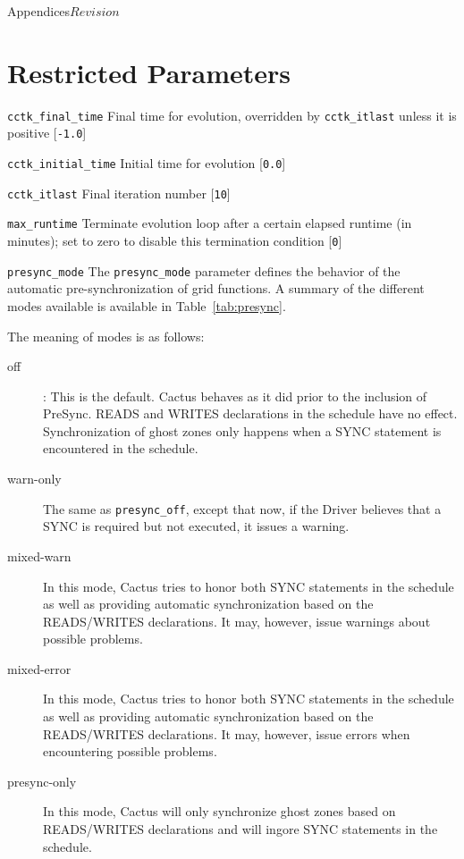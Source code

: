 \begin{cactuspart}{Appendices}{}{$Revision$}
\begin{Lentry}
\end{Lentry}

\section{Restricted Parameters}

\begin{Lentry}

\item [{\tt cctk\_final\_time}] Final time for evolution, overridden by
{\tt cctk\_itlast} unless it is positive [{\tt -1.0}]

\item[{\tt cctk\_initial\_time}]
Initial time for evolution [{\tt 0.0}]

\item [{\tt cctk\_itlast}]
Final iteration number [{\tt 10}]

\item [{\tt max\_runtime}]
Terminate evolution loop after a certain elapsed runtime (in minutes); set to zero to disable this termination condition [{\tt 0}]

\item [{\tt presync\_mode}]
The \texttt{presync\_mode} parameter defines the behavior of the automatic pre-synchronization of grid functions. A summary of the different modes available is available in Table~\ref{tab:presync}.

The meaning of modes is as follows:
\begin{description}
\item[off]: This is the default. Cactus behaves as it did prior to the inclusion of PreSync. READS and
WRITES declarations in the schedule have no effect. Synchronization of ghost zones only happens when
a SYNC statement is encountered in the schedule.
\item[warn-only] The same as \texttt{presync\_off}, except that now, if the Driver
believes that a SYNC is required but not executed, it issues a warning.
\item[mixed-warn]
In this mode, Cactus tries to honor both SYNC statements in
the schedule as well as providing automatic synchronization based on the READS/WRITES declarations.
It may, however, issue warnings about possible problems.
\item[mixed-error]
In this mode, Cactus tries to honor both SYNC statements in
the schedule as well as providing automatic synchronization based on the READS/WRITES declarations.
It may, however, issue errors when encountering possible problems.
\item[presync-only]
In this mode, Cactus will only synchronize ghost zones based on READS/WRITES declarations and will
ingore SYNC statements in the schedule.
\end{description}


\end{Lentry}
\end{cactuspart}
